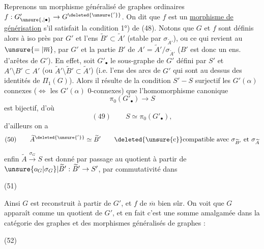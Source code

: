 Reprenons un morphisme généralisé de graphes ordinaires $f:G'_{\unsure{,|\bullet}}\to G^{\deleted{\unsure{'}}}$. On dit que $f$ est un \uline{morphisme de générisation} s'il satisfait la condition 1°) de (48). Notons que $G$ et $f$ sont définis alors à iso près par $G'$ et l'ens $\widetilde B'\subset\widetilde A'$ (stable par $\sigma_{\widetilde A'}$), ou ce qui revient au $\unsure{=|\overline m}$, par $G'$ et la  partie $B'$ de $A'=\widetilde A'/\sigma_{\widetilde A'}$ ($B'$ est donc un ens. d'arêtes de $G'$). En effet, soit $G'_\bullet$ le sous-graphe de $G'$ défini par $S'$ et $A'\setminus B'\subset A'$ (ou $\widetilde A'\setminus\widetilde B'\subset\widetilde A'$) (i.e.  l'ens des  arcs de $G'$ qui sont au dessus des identités de $\Pi_1(G)$). Alors il résulte de la condition $S'{-}S$ surjectif  les $G'(\alpha)$ connexes ($\Longleftrightarrow$ les $G'(\alpha)$ 0-connexes) que  l'homomorphisme canonique
\[
\pi_0(G'_\bullet)\longrightarrow S
\]
est bijectif, d'où
\[
(49)\qquad S\simeq\pi_0(G'_\bullet),
\]
d'ailleurs on a
\[
(50)\qquad\widetilde A^{\deleted{\unsure{'}}}\simeq\widetilde B'\qquad\deleted{\unsure{\mathrm c}}\text{compatible avec }\sigma_{\widetilde B'}\text{ et }\sigma_{\widetilde A}
\]

enfin $\widetilde A\xrightarrow{\sigma_G}S$ est donné par passage au quotient à partir de $\unsure{o_G|\sigma_G}|\widetilde B':\widetilde B'\to S'$, par commutativité dans

(51)\quad{}

Ainsi $G$ est reconstruit à partir de $G'$, et $f$ de $\overline m$ bien sûr. On voit que $G$ apparaît comme un quotient de $G'$, et en fait c'est  une somme amalgamée dans la catégorie des graphes et des morphismes généralisés de graphes :

(52)\quad{}

